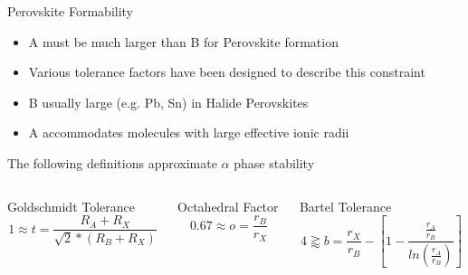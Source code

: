 \documentclass[10pt, aspectratio=169, presentation]{beamer}
\begin{document}
\begin{frame}[label={sec:orgeecffb6}]{Perovskite Formability}
\begin{itemize}
\item A must be much larger than B for Perovskite formation
\item Various tolerance factors have been designed to describe this constraint
\item B usually large (e.g. Pb, Sn) in Halide Perovskites
\item A accommodates \alert{molecules} with large effective ionic radii\autocite{kieslich-2015-exten-toler}
\end{itemize}

The following definitions approximate \(\alpha\) phase stability
\autocite{yin-2015-halid-perov,bartel-2019-new-toler}
\begin{columns}
\begin{column}{0.33\columnwidth}
\begin{block}{Goldschmidt Tolerance}
\[
1 \approx t = \frac{R_A+R_X}{\sqrt{2}*(R_B+R_X)}
\]
\end{block}
\end{column}

\begin{column}{0.33\columnwidth}
\begin{block}{Octahedral Factor}
\[
0.67 \approx o=\frac{r_B}{r_X}
\]
\end{block}
\end{column}

\begin{column}{0.33\columnwidth}
\begin{block}{Bartel Tolerance}
\[
4 \gtrapprox b = \frac{r_X}{r_B}-\left[ 1-\frac{\frac{r_A}{r_B}}{ln(\frac{r_A}{r_B})} \right]
\]
\end{block}
\end{column}
\end{columns}
\end{frame}
\end{document}
